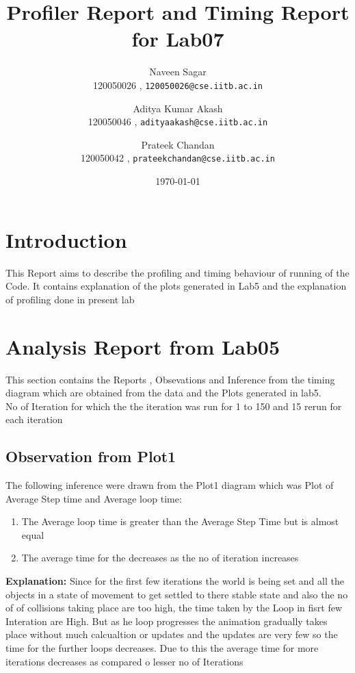 \documentclass[11pt,]{article}
\begin{document}
\begin{singlespace}
\title{Profiler Report and Timing Report for Lab07}
\author{Naveen Sagar\\
120050026 , \texttt{120050026@cse.iitb.ac.in} \\
\and
Aditya Kumar Akash\\
120050046 , \texttt{adityaakash@cse.iitb.ac.in} \\ 
\and
Prateek Chandan\\
120050042 , \texttt{prateekchandan@cse.iitb.ac.in} \\}
\date{\today}
\maketitle 
\section{Introduction}
This Report aims to describe the profiling and timing behaviour of running of the Code. It contains explanation of the plots generated in Lab5
 and the explanation of profiling done in present lab
\section{Analysis Report from Lab05}
This section contains the Reports , Obsevations and Inference from the timing diagram which are obtained from the data and the 
Plots generated in lab5.\\
No of Iteration for which the 	the iteration was run for 1 to 150 and 15 rerun for each iteration
\subsection{Observation from Plot1}
The following inference were drawn from the Plot1 diagram which was Plot of Average Step time  and Average loop time:
\begin{enumerate}
    \item The Average loop time is greater than the Average Step Time but is almost equal
    \item The average time for the decreases as the no of iteration increases
\end{enumerate}
\textbf{Explanation:}
Since for the first few iterations the world is being set and all the objects in a state of movement to get settled to there stable state
and also the no of of collisions taking place are too high, the time taken by the Loop in fisrt few Interation are High.
But as he loop progresses the animation gradually takes place without much calcualtion or updates and the updates are very few so the time for 
the further loops decreases. Due to this the average time for more iterations decreases as compared o lesser no of Iterations\\


\end{singlespace}
\end{document}
